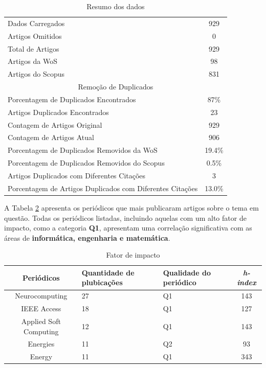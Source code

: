 \begin{table}[H]
	\centering
	\caption{Resumo dos dados}
	\label{tab:resumo}
	\begin{tabular}{lc}
		\hline
		Dados Carregados & 929 \\
		Artigos Omitidos & 0 \\
		Total de Artigos & 929 \\
		Artigos da WoS & 98 \\
		Artigos do Scopus & 831 \\
		\hline
		\multicolumn{2}{c}{Remoção de Duplicados} \\
		\hline
		Porcentagem de Duplicados Encontrados & 87\% \\
		Artigos Duplicados Encontrados & 23 \\
		Contagem de Artigos Original & 929 \\
		Contagem de Artigos Atual & 906 \\
		Porcentagem de Duplicados Removidos da WoS & 19.4\% \\
		Porcentagem de Duplicados Removidos do Scopus & 0.5\% \\
		Artigos Duplicados com Diferentes Citações & 3 \\
		Porcentagem de Artigos Duplicados com Diferentes Citações & 13.0\% \\
		\hline
	\end{tabular}
	
\end{table}


A Tabela \ref{tb2} apresenta os periódicos que mais publicaram artigos sobre o tema em questão. Todas os periódicos listadas, incluindo aquelas com um alto fator de impacto, como a categoria \textbf{Q1}, apresentam uma correlação significativa com as áreas de \textbf{informática, engenharia e matemática}.

\begin{table}[H]
	\centering
	\caption{Fator de impacto}\label{tb2}
	\begin{tabular}{@{}cp{3cm}p{3cm}c@{}}
		\toprule
		Periódicos      & Quantidade de plubicações & Qualidade do periódico & \textit{h-index} \\\midrule
		Neurocomputing         & 27                         & Q1                     & 143     \\
		IEEE Access            & 18                         & Q1                     & 127     \\
		Applied Soft Computing & 12                         & Q1                     & 143     \\
		Energies               & 11                         & Q2                     & 93      \\
		Energy                 & 11                         & Q1                     & 343     \\ \bottomrule
	\end{tabular}
	
	
\end{table}

